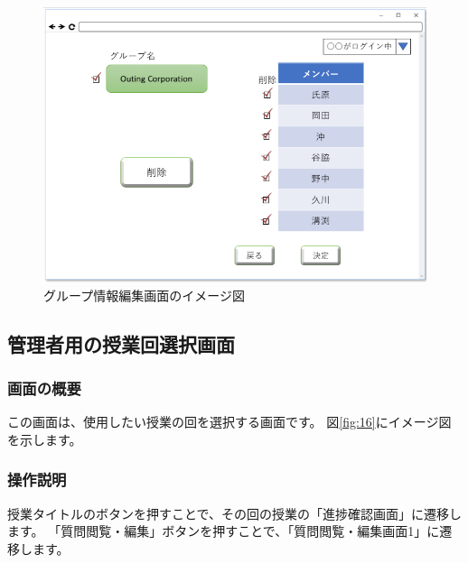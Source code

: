 \begin{figure}[htbp]
  \begin{center}
    \includegraphics[width=1\linewidth,clip]{./img/15.png}
    \caption{グループ情報編集画面のイメージ図}\label{fig:15}
  \end{center}
\end{figure}

\newpage

\subsection{管理者用の授業回選択画面}
\subsubsection{画面の概要}
この画面は、使用したい授業の回を選択する画面です。
図\ref{fig:16}にイメージ図を示します。

\subsubsection{操作説明}
授業タイトルのボタンを押すことで、その回の授業の「進捗確認画面」に遷移します。
「質問閲覧・編集」ボタンを押すことで、「質問閲覧・編集画面1」に遷移します。

